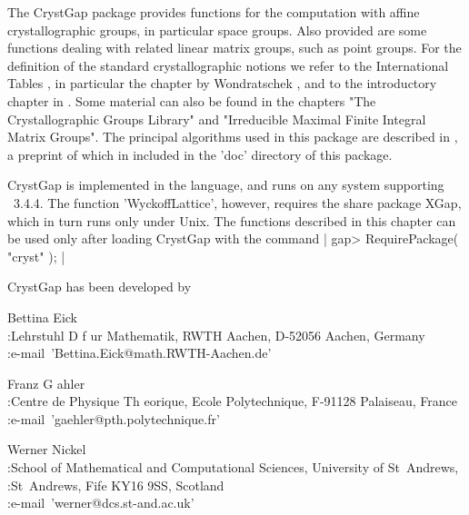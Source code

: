 
%

The  CrystGap package provides  functions for the computation with affine
crystallographic groups, in particular  space groups.  Also  provided are
some functions dealing with related  linear matrix groups, such as  point
groups.  For  the definition of the  standard crystallographic notions we
refer to the International Tables \cite{Hah95}, in particular the chapter
by  Wondratschek  \cite{Won95},  and   to the   introductory   chapter in
\cite{BBNWZ78}.  Some  material  can also be  found in  the chapters "The
Crystallographic Groups Library" and "Irreducible Maximal Finite Integral
Matrix   Groups".  The principal   algorithms  used in  this package  are
described in \cite{egn97b}, a preprint  of which in  included in the 'doc'
directory of this package.

CrystGap is  implemented in the {\GAP} language,  and  runs on any system
supporting {\GAP}~3.4.4. The function 'WyckoffLattice', however, requires
the share package  {\sf XGap}, which in  turn runs only  under Unix.  The
functions  described in this   chapter  can be used  only  after  loading
CrystGap with the command 
| 
     gap> RequirePackage( "cryst" ); 
|

CrystGap has been developed by

Bettina Eick\\
:Lehrstuhl D f{ u}r Mathematik, RWTH Aachen, 
D-52056 Aachen, Germany \\ 
:e-mail\:\ 'Bettina.Eick@math.RWTH-Aachen.de'

Franz G{ a}hler \\
:Centre de Physique Th{ e}orique, Ecole Polytechnique, 
F-91128 Palaiseau, France\\
:e-mail\:\ 'gaehler@pth.polytechnique.fr'

Werner Nickel \\
:School of Mathematical and Computational Sciences, 
 University of St~Andrews, \\
:St~Andrews, Fife KY16 9SS, Scotland \\
:e-mail\:\ 'werner@dcs.st-and.ac.uk'


